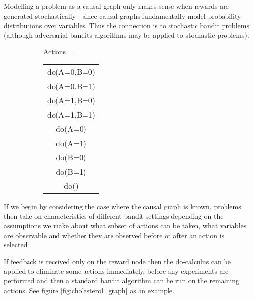 \documentclass[11pt,a4paper]{article}
\begin{document}
Modelling a problem as a causal graph only makes sense when rewards are generated stochastically - since causal graphs fundamentally model probability distributions over variables. Thus the connection is to stochastic bandit problems (although adversarial bandits algorithms may be applied to stochastic problems). 


\begin{figure}[h]
\caption{A simple causal graphical model and corresponding complete action space. A and B represent binary variables that can be intervened on and Y represents the reward.}
\label{fig:unify_frameworks}
\centering
\begin{subfigure}[c]{0.3\textwidth}
\end{subfigure}
\begin{subfigure}[t]{0.4\textwidth}
Actions = \begin{tabular}{|c|}
	\hline
  do(A=0,B=0) \\
  do(A=0,B=1) \\
  do(A=1,B=0) \\
  do(A=1,B=1) \\
  \hline
  do(A=0) \\
  do(A=1) \\
  do(B=0) \\
  do(B=1) \\
  do() \\
  \hline
\end{tabular}
\end{subfigure}
\end{figure}



If we begin by considering the case where the causal graph is known, problems then take on characteristics of different bandit settings depending on the assumptions we make about what subset of actions can be taken, what variables are observable and whether they are observed before or after an action is selected. 

If feedback is received only on the reward node then the do-calculus can be applied to eliminate some actions immediately, before any experiments are performed and then a standard bandit algorithm can be run on the remaining actions. See figure \ref{fig:cholesterol_graph} as an example. 
\end{document}
